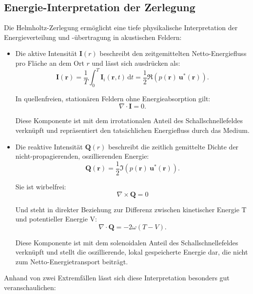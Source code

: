 \subsection{Energie-Interpretation der Zerlegung
\label{helmholtz:Energie_Interpretation}}
 
Die Helmholtz-Zerlegung ermöglicht eine tiefe physikalische Interpretation der Energieverteilung und -übertragung in akustischen Feldern:
 
\begin{itemize}
\item Die aktive Intensität $\boldsymbol{I}(r)$ beschreibt den zeitgemittelten Netto-Energiefluss pro Fläche an dem Ort $r$ und lässt sich ausdrücken als:
\begin{equation}
\boldsymbol{I}(\boldsymbol{r}) = \frac{1}{T}\int_0^T \boldsymbol{I}_i(\boldsymbol{r},t)\,\mathrm{d}t = \frac{1}{2}\Re\left( p(\boldsymbol{r})~\boldsymbol{u}^*(\boldsymbol{r})\right).
\end{equation}
 
In quellenfreien, stationären Feldern ohne Energieabsorption gilt:
\begin{equation}
\nabla \cdot \boldsymbol{I} = 0.
\end{equation}
 
Diese Komponente ist mit dem irrotationalen Anteil des Schallschnellefeldes verknüpft und repräsentiert den tatsächlichen Energiefluss durch das Medium.
 
\item Die reaktive Intensität $\boldsymbol{Q}(r)$ beschreibt die zeitlich gemittelte Dichte der nicht-propagierenden, oszillierenden Energie:
\begin{equation}
\boldsymbol{Q}(\boldsymbol{r}) = \frac{1}{2}\Im\left(p(\boldsymbol{r})~\boldsymbol{u}^*(\boldsymbol{r})\right).
\end{equation}
 
Sie ist wirbelfrei:
\begin{equation}
\nabla \times \boldsymbol{Q} = 0
\end{equation}
 
Und steht in direkter Beziehung zur Differenz zwischen kinetischer Energie T und potentieller Energie V:
\begin{equation}
\nabla \cdot \boldsymbol{Q} = -2 \omega (T-V).
\end{equation}
 
Diese Komponente ist mit dem solenoidalen Anteil des Schallschnellefeldes verknüpft und stellt die oszillierende, lokal gespeicherte Energie dar, die nicht zum Netto-Energietransport beiträgt.
\end{itemize}
Anhand von zwei Extremfällen lässt sich diese Interpretation besonders gut veranschaulichen:

